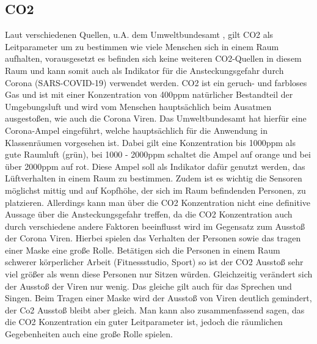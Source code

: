 \documentclass[]{article}
\begin{document}
		\subsection{CO2}
			Laut verschiedenen Quellen, u.A. dem Umweltbundesamt \cite{luftquali_bund_co2}\cite{luftquali_co2_corona}, gilt CO2 als Leitparameter um zu bestimmen wie viele Menschen sich in einem Raum aufhalten, vorausgesetzt es befinden sich keine weiteren CO2-Quellen in diesem Raum und kann somit auch als Indikator für die Ansteckungsgefahr durch Corona (SARS-COVID-19) verwendet werden. CO2 ist ein geruch- und farbloses Gas und ist mit einer Konzentration von 400ppm natürlicher Bestandteil der Umgebungsluft und wird vom Menschen hauptsächlich beim Ausatmen ausgestoßen, wie auch die Corona Viren. Das Umweltbundesamt \cite{luftquali_bund_co2_corona} hat hierfür eine Corona-Ampel eingeführt, welche hauptsächlich für die Anwendung in Klassenräumen vorgesehen ist. Dabei gilt eine Konzentration bis 1000ppm als gute Raumluft (grün), bei 1000 - 2000ppm schaltet die Ampel auf orange und bei über 2000ppm auf rot. Diese Ampel soll als Indikator dafür genutzt werden, das Lüftverhalten in einem Raum zu bestimmen. Zudem ist es wichtig die Sensoren möglichst mittig und auf Kopfhöhe, der sich im Raum befindenden Personen, zu platzieren. Allerdings kann man über die CO2 Konzentration nicht eine definitive Aussage über die Ansteckungsgefahr treffen, da die CO2 Konzentration auch durch verschiedene andere Faktoren beeinflusst wird im Gegensatz zum Ausstoß der Corona Viren. Hierbei spielen das Verhalten der Personen sowie das tragen einer Maske eine große Rolle. Betätigen sich die Personen in einem Raum schwerer körperlicher Arbeit (Fitnessstudio, Sport) so ist der CO2 Ausstoß sehr viel größer als wenn diese Personen nur Sitzen würden. Gleichzeitig verändert sich der Ausstoß der Viren nur wenig. Das gleiche gilt auch für das Sprechen und Singen. Beim Tragen einer Maske wird der Ausstoß von Viren deutlich gemindert, der Co2 Ausstoß bleibt aber gleich. Man kann also zusammenfassend sagen, das die CO2 Konzentration ein guter Leitparameter ist, jedoch die räumlichen Gegebenheiten auch eine große Rolle spielen.
\end{document}
